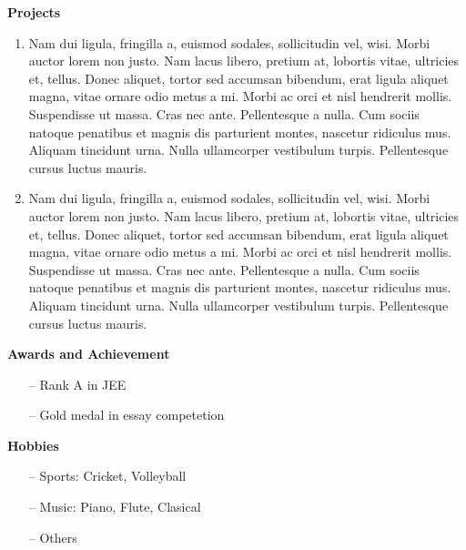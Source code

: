 \documentclass[a4paper, 10pt]{article}
\begin{document}
\textbf{Projects}

\begin{enumerate}
\item Nam dui ligula, fringilla a, euismod sodales, sollicitudin vel, wisi. Morbi auctor lorem non justo. Nam lacus
libero, pretium at, lobortis vitae, ultricies et, tellus. Donec aliquet, tortor sed accumsan bibendum, erat ligula
aliquet magna, vitae ornare odio metus a mi. Morbi ac orci et nisl hendrerit mollis. Suspendisse ut massa.
Cras nec ante. Pellentesque a nulla. Cum sociis natoque penatibus et magnis dis parturient montes, nascetur
ridiculus mus. Aliquam tincidunt urna. Nulla ullamcorper vestibulum turpis. Pellentesque cursus luctus
mauris.
\item Nam dui ligula, fringilla a, euismod sodales, sollicitudin vel, wisi. Morbi auctor lorem non justo. Nam lacus
libero, pretium at, lobortis vitae, ultricies et, tellus. Donec aliquet, tortor sed accumsan bibendum, erat ligula
aliquet magna, vitae ornare odio metus a mi. Morbi ac orci et nisl hendrerit mollis. Suspendisse ut massa.
Cras nec ante. Pellentesque a nulla. Cum sociis natoque penatibus et magnis dis parturient montes, nascetur
ridiculus mus. Aliquam tincidunt urna. Nulla ullamcorper vestibulum turpis. Pellentesque cursus luctus
mauris.
\end{enumerate}

\textbf{Awards and Achievement}
\begin{itemize}
    \item[--] Rank A in JEE
    \item[--] Gold medal in essay competetion
\end{itemize}

\textbf{Hobbies}
\begin{itemize}
    \item[--] Sports: Cricket, Volleyball
    \item[--] Music: Piano, Flute, Clasical
    \item[--] Others
\end{itemize}
\end{document}
